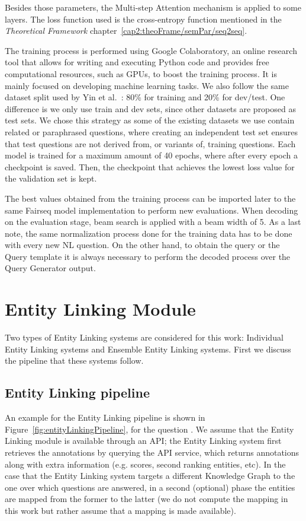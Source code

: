 Besides those parameters, the Multi-step Attention mechanism is applied to some layers. The 
loss function used is the cross-entropy function mentioned in the \textit{Theoretical 
Framework} chapter~\ref{cap2:theoFrame/semPar/seq2seq}.

The training process is performed using Google Colaboratory, an online research tool that 
allows for writing and executing Python code and provides free computational resources, such 
as GPUs, to boost the training process. It is mainly focused on developing machine learning 
tasks. We also follow the same dataset split used by Yin et al.~\cite{nmt:nl-to-sparql-Yin19}: 
80\% for training and 20\% for dev/test. One difference is we only use train and dev sets, 
since other datasets are proposed as test sets. We chose this strategy as some of the 
existing datasets we use contain related or paraphrased questions, where creating an 
independent test set ensures that test questions are not derived from, or variants of, 
training questions. Each model is trained for a maximum amount of 40 epochs, where after 
every epoch a checkpoint is saved. Then, the checkpoint that achieves the lowest loss value 
for the validation set is kept.

The best values obtained from the training process can be imported later to the same Fairseq 
model implementation to perform new evaluations. When decoding on the evaluation stage, beam 
search is applied with a beam width of 5. As a last note, the same normalization process done 
for the training data has to be done with every new NL question. On the other hand, to obtain 
the \SPARQL{} query or the Query template it is always necessary to perform the decoded process 
over the Query Generator output.

\section{Entity Linking Module}
\label{cap3:system/entLinModule}
Two types of Entity Linking systems are considered for this work: Individual Entity Linking 
systems and Ensemble Entity Linking systems. First we discuss the pipeline that these systems 
follow.

\subsection{Entity Linking pipeline}
\label{cap3:system/entLinModule/pipeline}
An example for the Entity Linking pipeline is shown in Figure~\ref{fig:entityLinkingPipeline}, 
for the question . We assume that the Entity Linking 
module is available through an API; the Entity Linking system first retrieves the annotations 
by querying the API service, which returns annotations along with extra information (e.g. scores, 
second ranking entities, etc). In the case that the Entity Linking system targets a different 
Knowledge Graph to the one over which questions are answered, in a second (optional) phase the 
entities are mapped from the former to the latter (we do not compute the mapping in this work 
but rather assume that a mapping is made available).

